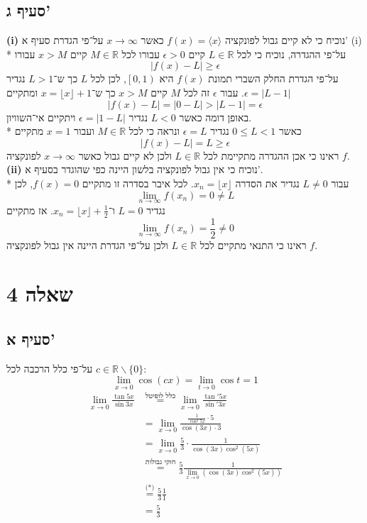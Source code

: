 \documentclass[a4paper]{article}
\def\RR{\mathbb{R}}
\begin{document}
\subsection{סעיף ג'}
\textbf{(i)}
נוכיח כי לא קיים גבול לפונקציה $f(x) = \langle x \rangle$ כאשר $x \to \infty$ על־פי הגדרת סעיף א' (i) \\*
על־פי ההגדרה, נוכיח כי לכל $L \in \RR$ קיים $\epsilon > 0$ עבורו לכל $M \in \RR$ קיים $x > M$ עבורו
\[
	\left| f(x) - L \right| \ge \epsilon
\]
על־פי הגדרת החלק השברי תמונת $f(x)$ היא $\left[0, 1\right)$, לכן לכל $L$ כך ש־$L > 1$ נגדיר $\epsilon = |L - 1|$. %
עבור $\epsilon$ זה לכל $M$ קיים $x > M$ כך ש־$x = \lfloor x \rfloor + 1$ ומתקיים
\[
	\left| f(x) - L \right| = \left| 0 - L \right| > \left| L - 1 \right| = \epsilon
\]
באופן דומה כאשר $L < 0$ נגדיר $\epsilon = \left| 1 - L \right|$ ויתקיים אי־השוויון. \\*
כאשר $0 \le L < 1$ נגדיר $\epsilon = L$ ונראה כי לכל $M \in \RR$ ועבור $x = 1$ מתקיים
\[
	\left| f(x) - L \right| = L \ge \epsilon
\]
ראינו כי אכן ההגדרה מתקיימת לכל $L \in \RR$ ולכן לא קיים גבול כאשר $x \to \infty$ לפונקציה $f$. \\
\textbf{(ii)}
נוכיח כי אין גבול לפונקציה בלשון היינה כפי שהוגדר בסעיף א'. \\*
עבור $L \ne 0$ נגדיר את הסדרה $x_n = \lfloor x \rfloor$.
לכל איבר בסדרה זו מתקיים $f(x) = 0$, לכן
\[
	\lim_{n \to \infty} f(x_n) = 0 \ne L
\]
נגדיר $L = 0$ ו־$x_n = \lfloor x \rfloor + \frac{1}{2}$. אז מתקיים
\[
	\lim_{n \to \infty} f(x_n) = \frac{1}{2} \ne 0
\]
ראינו כי התנאי מתקיים לכל $L \in \RR$ ולכן על־פי הגדרת היינה אין גבול לפונקציה $f$.

\section{שאלה 4}
\subsection{סעיף א'}
על־פי כלל הרכבה לכל $c \in \RR\backslash\{0\}$:
\[
	\lim_{x \to 0} \cos(c x) = \lim_{t \to 0} \cos t = 1 \tag{*}
\]
\begin{align*}
	\lim_{x \to 0} \frac{\tan 5x}{\sin 3x}
	& \overset{\text{כלל לופיטל}}{=} \lim_{x \to 0} \frac{\tan' 5x}{\sin' 3x}\\
	& = \lim_{x \to 0} \frac{\frac{1}{\cos^2 5x} \cdot 5}{\cos(3x) \cdot 3}\\
	& = \lim_{x \to 0} \frac{5}{3} \cdot \frac{1}{\cos(3x) \cos^2(5x)}\\
	& \overset{\text{חוקי גבולות}}{=} \frac{5}{3} \frac{1}{\lim_{x \to 0} \left( \cos(3x) \cos^2(5x)\right)} \\
	& \overset{\text{(*)}}{=} \frac{5}{3} \frac{1}{1}\\
	& = \frac{5}{3}
\end{align*}
\end{document}
